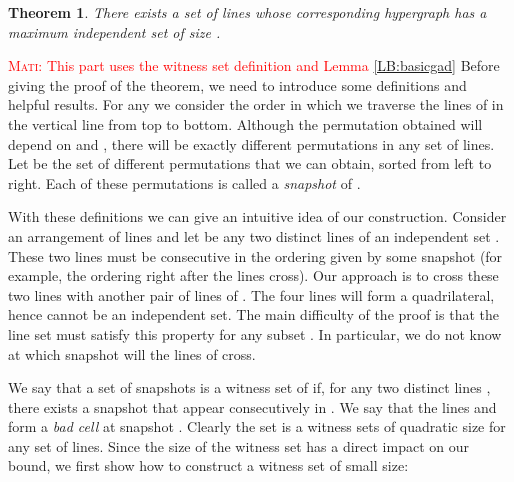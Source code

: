 \documentclass[11pt,a4paper]{article}
\newtheorem{theorem}{Theorem}
\newcommand{\mati}[1]{\textcolor{red}{\textsc{Mati:} #1}}
\begin{document}
\begin{theorem}\label{Athe:ubis}
There exists a set  of  lines whose corresponding hypergraph  has a  maximum independent set of size .
\end{theorem}

\mati{This part uses the witness set definition and Lemma \ref{LB:basicgad}}
\iffalse
Before giving the proof of the theorem, we need to introduce some definitions and helpful results. For any  we consider the order in which we traverse the lines of  in the vertical line  from top to bottom. Although the permutation obtained will depend on  and , there will be exactly  different permutations in any set  of  lines. Let  be the set of different permutations that we can obtain, sorted from left to right. Each of these permutations is called a {\em snapshot} of .

With these definitions we can give an intuitive idea of our construction. Consider an arrangement  of  lines and let  be any two distinct lines of an independent set . These two lines must be consecutive in the ordering given by some snapshot (for example, the ordering right after the lines cross). Our approach is to cross these two lines with another pair of lines of . The four lines will form a quadrilateral, hence  cannot be an independent set. The main difficulty of the proof is that the line set must satisfy this property for any subset . In particular, we do not know at which snapshot will the lines of  cross.

We say that a set of snapshots  is a witness set of  if, for any two distinct lines , there exists a snapshot   that appear consecutively in . We say that the lines  and  form a {\em bad cell} at snapshot . Clearly the set  is a witness sets of quadratic size for any set of  lines. Since the size of the witness set has a direct impact on our bound, we first show how to construct a witness set of small size:
\end{document}
